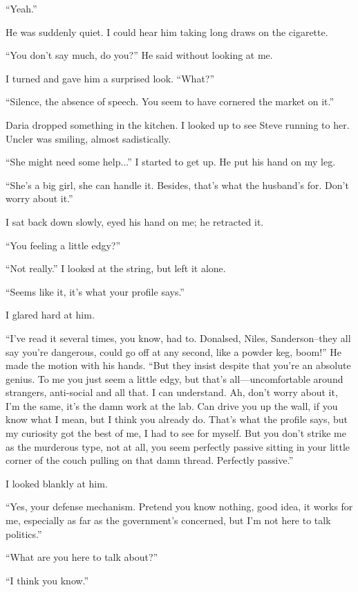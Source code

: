 ``Yeah.''

He was suddenly quiet. I could hear him taking long draws on the
cigarette.

``You don't say much, do you?'' He said without looking at me.

I turned and gave him a surprised look. ``What?''

``Silence, the absence of speech. You seem to have cornered the market
on it.''

Daria dropped something in the kitchen. I looked up to see Steve running
to her. Uncler was smiling, almost sadistically.

``She might need some help...'' I started to get up. He put his hand on
my leg.

``She's a big girl, she can handle it. Besides, that's what the
husband's for. Don't worry about it.''

I sat back down slowly, eyed his hand on me; he retracted it.

``You feeling a little edgy?''

``Not really.'' I looked at the string, but left it alone.

``Seems like it, it's what your profile says.''

I glared hard at him.

``I've read it several times, you know, had to. Donalsed, Niles,
Sanderson--they all say you're dangerous, could go off at any second,
like a powder keg, boom!'' He made the motion with his hands. ``But they
insist despite that you're an absolute genius. To me you just seem a
little edgy, but that's all---uncomfortable around strangers,
anti-social and all that. I can understand. Ah, don't worry about it,
I'm the same, it's the damn work at the lab. Can drive you up the wall,
if you know what I mean, but I think you already do. That's what the
profile says, but my curiosity got the best of me, I had to see for
myself. But you don't strike me as the murderous type, not at all, you
seem perfectly passive sitting in your little corner of the couch
pulling on that damn thread. Perfectly passive.''

I looked blankly at him.

``Yes, your defense mechanism. Pretend you know nothing, good idea, it
works for me, especially as far as the government's concerned, but I'm
not here to talk politics.''

``What are you here to talk about?''

``I think you know.''

